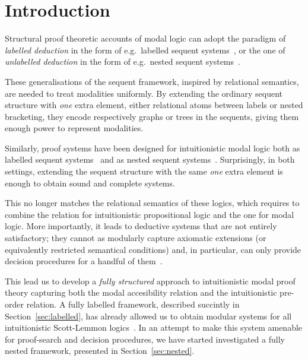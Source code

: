 \documentclass[twoside]{aiml20}
\begin{document}
\section{Introduction}

Structural proof theoretic accounts of modal logic can adopt the paradigm of \emph{labelled deduction} in the form of e.g.~labelled sequent systems~\cite{vigano2000,negri2005}, or the one of \emph{unlabelled deduction} in the form of e.g.~nested sequent systems~\cite{brunnler2009deep,poggiolesi2009method}.

These generalisations of the sequent framework, inspired by relational semantics, are needed to treat modalities uniformly. 
%
By extending the ordinary sequent structure with \emph{one} extra element, either relational atoms between labels or nested bracketing, they encode respectively graphs or trees in the sequents, giving them enough power to represent modalities. 

Similarly, proof systems have been designed for intuitionistic modal logic both as labelled sequent systems~\cite{simpson1994} and as nested sequent systems~\cite{strassburger2013,kuznets:strassburger:maehara}.
%
Surprisingly, in both settings, extending the sequent structure with the same \emph{one} extra element is enough to obtain sound and complete systems.

This no longer matches the relational semantics of these logics, which requires to combine the relation for intuitionistic propositional logic and the one for modal logic. 
%
More importantly, it leads to deductive systems that are not entirely satisfactory; they cannot as modularly capture axiomatic extensions (or equivalently restricted semantical conditions) and, in particular, can only provide decision procedures for a handful of them~\cite{simpson1994}.

This lead us to develop a \emph{fully structured} approach to intuitionistic modal proof theory capturing both the modal accesibility relation and the intuitionistic pre-order relation. 
%
A fully labelled framework, described succintly in Section~\ref{sec:labelled}, has already allowed us to obtain modular systems for all intuitionistic Scott-Lemmon logics~\cite{marin:morales:strassburger:hal}. 
%
In an attempt to make this system amenable for proof-search and decision procedures, we have started investigated a fully nested framework, presented in Section~\ref{sec:nested}.

%
%
%
\end{document}
